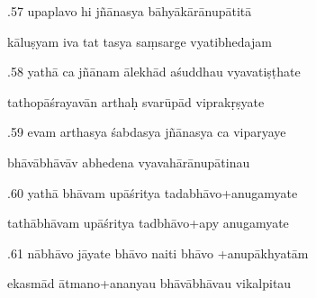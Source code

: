 \documentclass[article,12pt,a4paper]{memoir}%
\newcounter{parCount}
\begin{document}
	  
	  \pstart {}.57 upaplavo hi jñānasya bāhyākārānupātitā 
	{}
	\pend%
      

	  
	  \pstart \leavevmode%
	kāluṣyam iva tat tasya saṃsarge vyatibhedajam 
	{}
	\pend%
      

	  
	  \pstart {}.58 yathā ca jñānam ālekhād aśuddhau vyavatiṣṭhate 
	{}
	\pend%
      

	  
	  \pstart \leavevmode%
	tathopāśrayavān arthaḥ svarūpād viprakṛṣyate 
	{}
	\pend%
      

	  
	  \pstart {}.59 evam arthasya śabdasya jñānasya ca viparyaye 
	{}
	\pend%
      

	  
	  \pstart \leavevmode%
	bhāvābhāvāv abhedena vyavahārānupātinau 
	{}
	\pend%
      

	  
	  \pstart {}.60 yathā bhāvam upāśritya tadabhāvo+anugamyate 
	{}
	\pend%
      

	  
	  \pstart \leavevmode%
	tathābhāvam upāśritya tadbhāvo+apy anugamyate 
	{}
	\pend%
      

	  
	  \pstart {}.61 nābhāvo jāyate bhāvo naiti bhāvo +anupākhyatām 
	{}
	\pend%
      

	  
	  \pstart \leavevmode%
	ekasmād ātmano+ananyau bhāvābhāvau vikalpitau 
	{}
	\pend%
      
\end{document}
